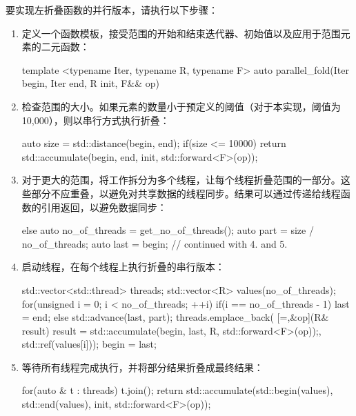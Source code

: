 要实现左折叠函数的并行版本，请执行以下步骤：

\begin{enumerate}
\item
定义一个函数模板，接受范围的开始和结束迭代器、初始值以及应用于范围元素的二元函数：

\begin{cpp}
template <typename Iter, typename R, typename F>
auto parallel_fold(Iter begin, Iter end, R init, F&& op)
{
}
\end{cpp}

\item
检查范围的大小。如果元素的数量小于预定义的阈值（对于本实现，阈值为10,000），则以串行方式执行折叠：

\begin{cpp}
auto size = std::distance(begin, end);
if(size <= 10000)
    return std::accumulate(begin, end,
                           init, std::forward<F>(op));
\end{cpp}

\item
对于更大的范围，将工作拆分为多个线程，让每个线程折叠范围的一部分。这些部分不应重叠，以避免对共享数据的线程同步。结果可以通过传递给线程函数的引用返回，以避免数据同步：

\begin{cpp}
else
{
    auto no_of_threads = get_no_of_threads();
    auto part = size / no_of_threads;
    auto last = begin;
    // continued with 4. and 5.
}
\end{cpp}

\item
启动线程，在每个线程上执行折叠的串行版本：

\begin{cpp}
std::vector<std::thread> threads;
std::vector<R> values(no_of_threads);
for(unsigned i = 0; i < no_of_threads; ++i)
{
    if(i == no_of_threads - 1) last = end;
    else std::advance(last, part);
    threads.emplace_back(
        [=,&op](R& result){
            result = std::accumulate(begin, last, R{},
                                     std::forward<F>(op));},
    std::ref(values[i]));
    begin = last;
}
\end{cpp}

\item
等待所有线程完成执行，并将部分结果折叠成最终结果：

\begin{cpp}
for(auto & t : threads) t.join();
return std::accumulate(std::begin(values), std::end(values),
                       init, std::forward<F>(op));
\end{cpp}
\end{enumerate}

